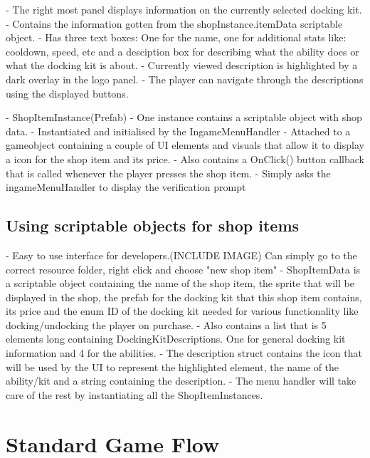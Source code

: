         - The right most panel displays information on the currently selected docking kit. 
            - Contains the information gotten from the shopInstance.itemData scriptable object. 
            - Has three text boxes: One for the name, one for additional stats like: cooldown, speed, etc and a desciption box for describing what the ability does or what the docking kit is about. 
            - Currently viewed description is highlighted by a dark overlay in the logo panel. 
            - The player can navigate through the descriptions using the displayed buttons.

- ShopItemInstance(Prefab)
    - One instance contains a scriptable object with shop data.
    - Instantiated and initialised by the IngameMenuHandler
    - Attached to a gameobject containing a couple of UI elements and visuals that allow it to display a icon for the shop item and its price. 
    - Also contains a OnClick() button callback that is called whenever the player presses the shop item.
        - Simply asks the ingameMenuHandler to display the verification prompt

\subsection{Using scriptable objects for shop items}
- Easy to use interface for developers.(INCLUDE IMAGE) Can simply go to the correct resource folder, right click and choose "new shop item"
- ShopItemData is a scriptable object containing the name of the shop item, the sprite that will be displayed in the shop, the prefab for the docking kit that this shop item contains, its price and the enum ID of the docking kit needed for various functionality like docking/undocking the player on purchase. 
- Also contains a list that is 5 elements long containing DockingKitDescriptions. One for general docking kit information and 4 for the abilities. 
- The description struct contains the icon that will be used by the UI to represent the highlighted element, the name of the ability/kit and a string containing the description.
- The menu handler will take care of the rest by instantiating all the ShopItemInstances.

\section{Standard Game Flow}
